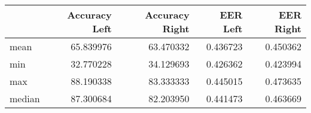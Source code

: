 \begin{tabular}{lrrrr}
\toprule
{} &  Accuracy Left &  Accuracy Right &  EER Left &  EER Right \\
\midrule
mean   &      65.839976 &       63.470332 &  0.436723 &   0.450362 \\
min    &      32.770228 &       34.129693 &  0.426362 &   0.423994 \\
max    &      88.190338 &       83.333333 &  0.445015 &   0.473635 \\
median &      87.300684 &       82.203950 &  0.441473 &   0.463669 \\
\bottomrule
\end{tabular}
